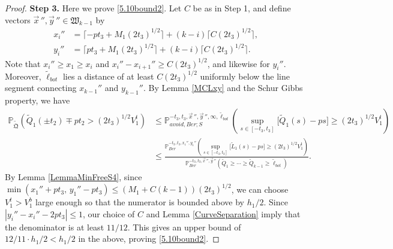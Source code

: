 \begin{proof}
	\noindent\textbf{Step 3.} Here we prove \eqref{5.10bound2}. Let $C$ be as in Step 1, and define vectors $\vec{x}\,'', \vec{y}\,''\in\mathfrak{W}_{k-1}$ by
	\begin{align*}
	x_i'' &= \lceil -pt_3 + M_1(2t_3)^{1/2}\rceil + (k-i)\lceil C(2t_3)^{1/2}\rceil,\\
	y_i'' &= \lceil pt_3 + M_1(2t_3)^{1/2}\rceil + (k-i)\lceil C(2t_3)^{1/2}\rceil.
	\end{align*}
	Note that $x_i'' \geq x_1 \geq x_i$ and $x_i''-x_{i+1}'' \geq C(2t_3)^{1/2}$, and likewise for $y_i''$. Moreover, $\tilde{\ell}_{bot}$ lies a distance of at least $C(2t_3)^{1/2}$ uniformly below the line segment connecting $x_{k-1}''$ and $y_{k-1}''$. By Lemma \ref{MCLxy} and the Schur Gibbs property, we have
	\begin{align*}
	\mathbb{P}_{\tilde{\mathfrak{Q}}}\left(\tilde{Q}_1(\pm t_2) \mp pt_2 > (2t_3)^{1/2}V_1^t\right) &\leq \mathbb{P}^{-t_3,t_3,\vec{x}\,'',\vec{y}\,'',\infty,\tilde{\ell}_{bot}}_{avoid,Ber;S}\left(\sup_{s\in[-t_3,t_3]} \big[\tilde{Q}_1(s)-ps\big] \geq (2t_3)^{1/2}V_1^t\right)\\
	&\leq \frac{\mathbb{P}^{-t_3,t_3,x_1'',y_1''}_{Ber}\left(\sup_{s\in[-t_3,t_3]} \big[\tilde{L}_1(s)-ps\big] \geq (2t_3)^{1/2}V_1^t\right)}{\mathbb{P}^{-t_3,t_3,\vec{x}\,'',\vec{y}\,''}_{Ber}\left(\tilde{Q}_1\geq\cdots\geq\tilde{Q}_{k-1}\geq\tilde{\ell}_{bot}\right)}.
	\end{align*}
	By Lemma \ref{LemmaMinFreeS4}, since $\min(x_1'' + pt_3, \, y_1'' - pt_3) \leq (M_1+C(k-1))(2t_3)^{1/2}$, we can choose $V_1^t > V_1^b$ large enough so that the numerator is bounded above by $h_1/2$. Since $|y_i'' - x_i'' - 2pt_3| \leq 1$, our choice of $C$ and Lemma \ref{CurveSeparation} imply that the denominator is at least $11/12$. This gives an upper bound of $12/11\cdot h_1/2 < h_1/2$ in the above, proving \eqref{5.10bound2}.
	
	
\end{proof}

